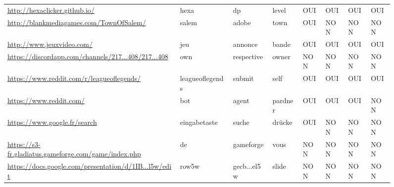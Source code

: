 \begin{figure}
\begin{tabular}{llllllll}
\scriptsize \url{http://hexaclicker.github.io/}                         & hexa            & dp                       & level          & \cellcolor[HTML]{9AFF99}OUI & \cellcolor[HTML]{9AFF99}OUI & \cellcolor[HTML]{9AFF99}OUI & \cellcolor[HTML]{9AFF99}OUI \\
\scriptsize \url{http://blankmediagames.com/TownOfSalem/}              & salem           & adobe                    & town           & \cellcolor[HTML]{9AFF99}OUI & \cellcolor[HTML]{FFCCC9}NON & \cellcolor[HTML]{FFCCC9}NON & \cellcolor[HTML]{FFCCC9}NON \\
\scriptsize \url{http://www.jeuxvideo.com/}                             & jeu             & annonce                  & bande          & \cellcolor[HTML]{9AFF99}OUI & \cellcolor[HTML]{9AFF99}OUI & \cellcolor[HTML]{9AFF99}OUI & \cellcolor[HTML]{9AFF99}OUI \\
\scriptsize \url{https://discordapp.com/channels/217...408/217...408}   & own             & respective               & owner          & \cellcolor[HTML]{FFCCC9}NON & \cellcolor[HTML]{FFCCC9}NON & \cellcolor[HTML]{FFCCC9}NON & \cellcolor[HTML]{FFCCC9}NON \\
\scriptsize \url{https://www.reddit.com/r/leagueoflegends/}             & leagueoflegends & submit                   & self           & \cellcolor[HTML]{9AFF99}OUI & \cellcolor[HTML]{9AFF99}OUI & \cellcolor[HTML]{9AFF99}OUI & \cellcolor[HTML]{9AFF99}OUI \\
\scriptsize \url{https://www.reddit.com/}                               & bot             & agent                    & pardner        & \cellcolor[HTML]{9AFF99}OUI & \cellcolor[HTML]{9AFF99}OUI & \cellcolor[HTML]{9AFF99}OUI & \cellcolor[HTML]{FFCCC9}NON \\
\scriptsize \url{https://www.google.fr/search}                          & eingabetaste    & suche                    & drücke         & \cellcolor[HTML]{9AFF99}OUI & \cellcolor[HTML]{FFCCC9}NON & \cellcolor[HTML]{FFCCC9}NON & \cellcolor[HTML]{FFCCC9}NON \\
\scriptsize \url{https://s3-fr.gladiatus.gameforge.com/game/index.php}  & de              & gameforge                & vous           & \cellcolor[HTML]{FFCCC9}NON & \cellcolor[HTML]{FFCCC9}NON & \cellcolor[HTML]{FFCCC9}NON & \cellcolor[HTML]{FFCCC9}NON \\
\scriptsize \url{https://docs.google.com/presentation/d/1IB...l5w/edit} & row5w           & gecb...el5w & slide          & \cellcolor[HTML]{FFCCC9}NON & \cellcolor[HTML]{FFCCC9}NON & \cellcolor[HTML]{FFCCC9}NON & \cellcolor[HTML]{FFCCC9}NON \\

\end{tabular}
\end{figure}
